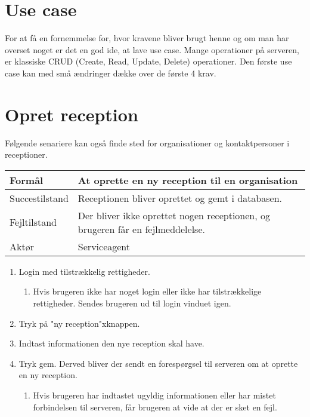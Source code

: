 \section{Use case}
For at få en fornemmelse for, hvor kravene bliver brugt henne og om man har overset noget er det en god ide, at lave use case\citep{LarmanUml}.
Mange operationer på serveren, er klassiske CRUD (Create, Read, Update, Delete) operationer. Den første use case kan med små ændringer dække over de første 4 krav.


\section{Opret reception}
Følgende senariere kan også finde sted for organisationer og kontaktpersoner i receptioner.

\begin{table}[h]
    \begin{tabular}{|p{3cm}|p{8.3cm}|}
    \hline
    Formål         & At oprette en ny reception til en organisation                              \\ \hline
    Succestilstand & Receptionen bliver oprettet og gemt i databasen.                            \\ \hline
    Fejltilstand   & Der bliver ikke oprettet nogen receptionen, og brugeren 
                     får en fejlmeddelelse. \\ \hline
    Aktør          & Serviceagent                                                                \\ \hline
    \end{tabular}
\end{table}

\begin{enumerate}
  \item Login med tilstrækkelig rettigheder.
  \begin{enumerate}
    \item Hvis brugeren ikke har noget login eller ikke har tilstrækkelige rettigheder. Sendes brugeren ud til login vinduet igen.
  \end{enumerate}
  \item Tryk på "ny reception"\hphantom xknappen. %
  \item Indtast informationen den nye reception skal have.
  \item Tryk gem. Derved bliver der sendt en forespørgsel til serveren om at oprette en ny reception.
  \begin{enumerate}
    \item Hvis brugeren har indtastet ugyldig informationen eller har mistet forbindelsen til serveren, får brugeren at vide at der er sket en fejl.
  \end{enumerate}
\end{enumerate}

